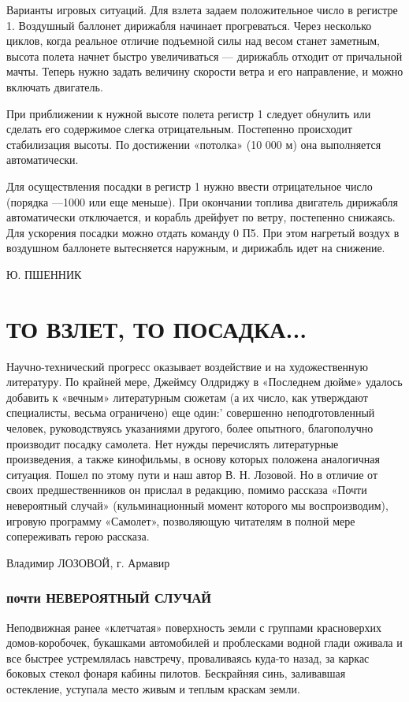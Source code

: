 \documentclass[11pt,a4paper,oneside]{article}
\begin{document}
Варианты игровых ситуаций. Для взлета задаем положительное число в регистре 1. Воздушный баллонет дирижабля начинает прогреваться. Через несколько циклов, когда реальное отличие подъемной силы над весом станет заметным, высота полета начнет быстро увеличиваться — дирижабль отходит от причальной мачты. Теперь нужно задать величину скорости ветра и его направление, и можно включать двигатель.

При приближении к нужной высоте полета регистр 1 следует обнулить или сделать его содержимое слегка отрицательным. Постепенно происходит стабилизация высоты. По достижении «потолка» (10 000 м) она выполняется автоматически.

Для осуществления посадки в регистр 1 нужно ввести отрицательное число (порядка —1000 или еще меньше). При окончании топлива двигатель дирижабля автоматически отключается, и корабль дрейфует по ветру, постепенно снижаясь. Для ускорения посадки можно отдать команду 0 П5. При этом нагретый воздух в воздушном баллонете вытесняется наружным, и дирижабль идет на снижение.

Ю. ПШЕННИК

\section{ТО ВЗЛЕТ, ТО ПОСАДКА...}
Научно-технический прогресс оказывает воздействие и на художественную литературу. По крайней мере, Джеймсу Олдриджу в «Последнем дюйме» удалось добавить к «вечным» литературным сюжетам (а их число, как утверждают специалисты, весьма ограничено) еще один:' совершенно неподготовленный человек, руководствуясь указаниями другого, более опытного, благополучно производит посадку самолета. Нет нужды перечислять литературные произведения, а также кинофильмы, в основу которых положена аналогичная ситуация. Пошел по этому пути и наш автор В. Н. Лозовой. Но в отличие от своих предшественников он прислал в редакцию, помимо рассказа «Почти невероятный случай» (кульминационный момент которого мы воспроизводим), игровую программу «Самолет», позволяющую читателям в полной мере сопереживать герою рассказа.

Владимир ЛОЗОВОЙ, г. Армавир

\subsubsection{почти НЕВЕРОЯТНЫЙ СЛУЧАЙ}
Неподвижная ранее «клетчатая» поверхность земли с группами красноверхих домов-коробочек, букашками автомобилей и проблесками водной глади оживала и все быстрее устремлялась навстречу, проваливаясь куда-то назад, за каркас боковых стекол фонаря кабины пилотов. Бескрайняя синь, заливавшая остекление, уступала место живым и теплым краскам земли.
\end{document}
